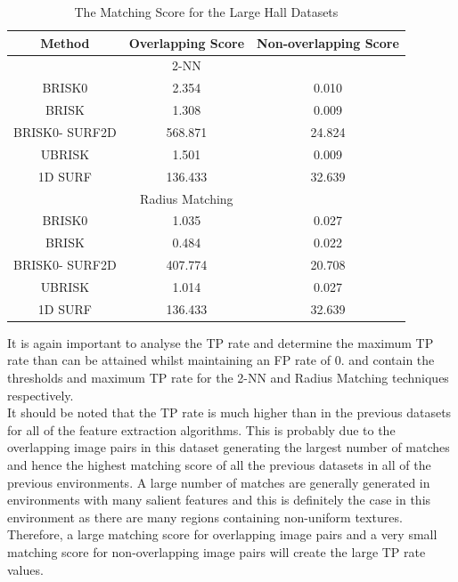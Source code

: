 \documentclass[11pt]{report}
\begin{document}
\begin{table}
\caption{The Matching Score for the Large Hall Datasets}
\begin{tabular}{|c|c|c|}
\hline 
Method & Overlapping Score & Non-overlapping Score\tabularnewline
\hline 
\hline 
 & 2-NN & \tabularnewline
\hline 
BRISK0 & 2.354 & 0.010\tabularnewline
\hline 
BRISK & 1.308 & 0.009\tabularnewline
\hline 
BRISK0- SURF2D & 568.871 & 24.824\tabularnewline
\hline 
UBRISK & 1.501 & 0.009\tabularnewline
\hline 
1D SURF & 136.433 & 32.639\tabularnewline
\hline 
 & Radius Matching & \tabularnewline
\hline 
BRISK0 & 1.035 & 0.027\tabularnewline
\hline 
BRISK & 0.484 & 0.022\tabularnewline
\hline 
BRISK0- SURF2D & 407.774 & 20.708\tabularnewline
\hline 
UBRISK & 1.014 & 0.027\tabularnewline
\hline 
1D SURF & 136.433 & 32.639\tabularnewline
\hline 
\end{tabular}
\label{tab:lhMS}
\end{table}


It is again important to analyse the TP rate and determine the maximum TP rate than can be attained whilst maintaining an FP rate of $0$.  and  contain the thresholds and maximum TP rate for the 2-NN and Radius Matching techniques respectively.\\

It should be noted that the TP rate is much higher than in the previous datasets for all of the feature extraction algorithms. This is probably due to the overlapping image pairs in this dataset generating the largest number of matches and hence the highest matching score of all the previous datasets in all of the previous environments. A large number of matches are generally generated in environments with many salient features and this is definitely the case in this environment as there are many regions containing non-uniform textures. Therefore, a large matching score for overlapping image pairs and a very small matching score for non-overlapping image pairs will create the large TP rate values.\\
\end{document}
